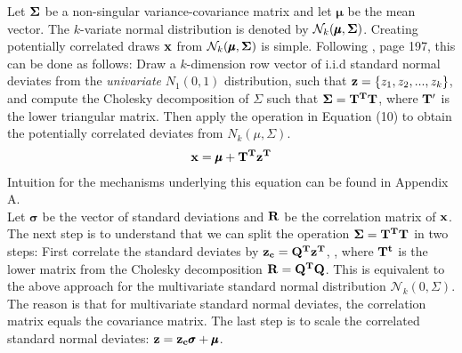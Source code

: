 \documentclass[a4paper,12pt]{article}
\begin{document}
\noindent
Let $\bold{\Sigma}$ be a non-singular variance-covariance matrix and let $\pmb{\mu}$ be the mean vector. The $k$-variate normal distribution is denoted by $\mathcal{N}_k(\pmb{\mu}, \bold{\Sigma})$. Creating potentially correlated draws $\bold{x}$ from $\mathcal{N}_k(\pmb{\mu}, \bold{\Sigma})$ is simple. Following \cite{lemaire2013structural}, page 197, this can be done as follows: Draw a $k$-dimension row vector of i.i.d standard normal deviates from the \textit{univariate} $N_1(0,1)$ distribution, such that  $\bold{z} = \{z_1, z_2, ..., z_k\}$, and compute the Cholesky decomposition of $\Sigma$ such that $\bold{\Sigma} = \bold{T^T T}$, where $\bold{T'}$ is the lower triangular matrix. Then apply the operation in Equation (10) to obtain the potentially correlated deviates from $N_k(\mu, \Sigma)$.
\begin{align}
\bold{x} = \pmb{\mu} + \bold{T^T z^T} 
\end{align}
Intuition for the mechanisms underlying this equation can be found in Appendix A.\\

\noindent
Let $\pmb{\sigma}$ be the vector of standard deviations and $\bold{R}$ be the correlation matrix of $\bold{x}$. The next step is to understand that we can split the operation $\bold{\Sigma} = \bold{T^T T}$ in two steps: First correlate the standard deviates by $\bold{z_c}=\bold{Q^T z^T}$, , where $\bold{T^t}$ is the lower matrix from the Cholesky decomposition $\bold{R}=\bold{Q^T Q}$. This is equivalent to the above approach for the multivariate standard normal distribution $\mathcal{N}_k(0, \Sigma)$. The reason is that for multivariate standard normal deviates, the correlation matrix equals the covariance matrix. The last step is to scale the correlated standard normal deviates: $\bold{z}=\bold{z_c}\pmb{\sigma} + \pmb{\mu}$.












\newpage

\end{document}
